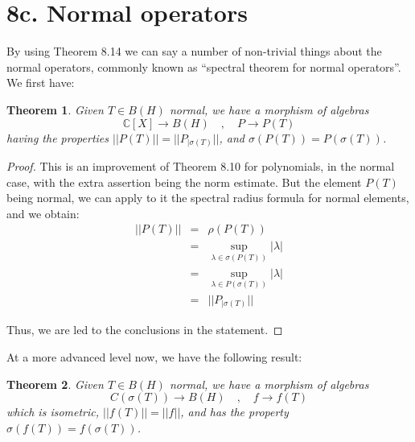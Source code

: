 \documentclass[12pt]{amsbook}
\newtheorem{theorem}{Theorem}[chapter]
\begin{document}
\section*{8c. Normal operators}

By using Theorem 8.14 we can say a number of non-trivial things about the normal operators, commonly known as ``spectral theorem for normal operators''. We first have:

\begin{theorem}
Given $T\in B(H)$ normal, we have a morphism of algebras
$$\mathbb C[X]\to B(H)\quad,\quad 
P\to P(T)$$
having the properties $||P(T)||=||P_{|\sigma(T)}||$, and $\sigma(P(T))=P(\sigma(T))$.
\end{theorem}

\begin{proof}
This is an improvement of Theorem 8.10 for polynomials, in the normal case, with the extra assertion being the norm estimate. But the element $P(T)$ being normal, we can apply to it the spectral radius formula for normal elements, and we obtain:
\begin{eqnarray*}
||P(T)||
&=&\rho(P(T))\\
&=&\sup_{\lambda\in\sigma(P(T))}|\lambda|\\
&=&\sup_{\lambda\in P(\sigma(T))}|\lambda|\\
&=&||P_{|\sigma(T)}||
\end{eqnarray*}

Thus, we are led to the conclusions in the statement.
\end{proof}

At a more advanced level now, we have the following result:

\begin{theorem}
Given $T\in B(H)$ normal, we have a morphism of algebras
$$C(\sigma(T))\to B(H)\quad,\quad 
f\to f(T)$$
which is isometric, $||f(T)||=||f||$, and has the property $\sigma(f(T))=f(\sigma(T))$.
\end{theorem}
\end{document}
